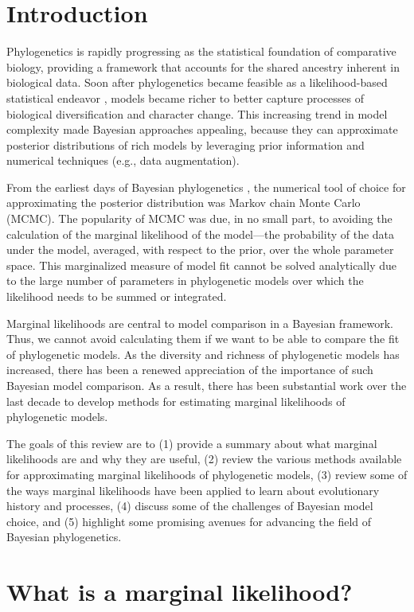 \section{Introduction}

Phylogenetics is rapidly progressing as the statistical foundation of
comparative biology, providing a framework that accounts for the shared
ancestry inherent in biological data.
Soon after phylogenetics became feasible as a likelihood-based statistical
endeavor \citep{Felsenstein1981}, models became richer to better
capture processes of biological diversification and character change.
This increasing trend in model complexity made Bayesian approaches appealing,
because they can approximate posterior distributions of rich models by
leveraging prior information and numerical techniques (e.g., data
augmentation).

From the earliest days of Bayesian phylogenetics \citep{Rannala1996,Mau1997},
the numerical tool of choice for approximating the posterior distribution was
Markov chain Monte Carlo (MCMC).
The popularity of MCMC was due, in no small part, to avoiding the calculation
of the marginal likelihood of the model---the probability of the data under the
model, averaged, with respect to the prior, over the whole parameter space.
This marginalized measure of model fit cannot be solved analytically due to the
large number of parameters in phylogenetic models over which the likelihood
needs to be summed or integrated. 

Marginal likelihoods are central to model comparison in a Bayesian framework.
Thus, we cannot avoid calculating them if we want to be able to compare the fit
of phylogenetic models.
As the diversity and richness of phylogenetic models has increased, there has
been a renewed appreciation of the importance of such Bayesian model
comparison.
As a result, there has been substantial work over the last decade to develop
methods for estimating marginal likelihoods of phylogenetic models.

The goals of this review are to
(1) provide a summary about what marginal likelihoods are and why they are
useful,
(2) review the various methods available for approximating marginal likelihoods
of phylogenetic models,
(3) review some of the ways marginal likelihoods have been applied to learn
about evolutionary history and processes,
(4) discuss some of the challenges of Bayesian model choice, and
(5) highlight some promising avenues for advancing the field of Bayesian
phylogenetics.

\section{What is a marginal likelihood?}

